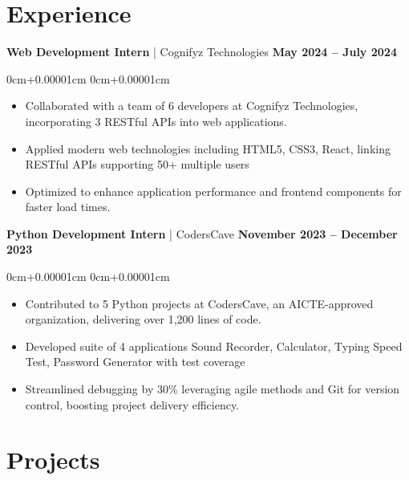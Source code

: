 \documentclass[10pt,a4paper]{article}
\newenvironment{highlights}{
    \begin{itemize}[
        topsep=0.10cm,
        parsep=0.10cm,
        partopsep=0pt,
        itemsep=0pt,
        leftmargin=10pt,
    ]
    }{
    \end{itemize}
}
\newenvironment{onecolentry}{
    \begin{adjustwidth}{
        0cm+0.00001cm
    }{
        0cm+0.00001cm
    }
    }{
    \end{adjustwidth}
}
\begin{document}
    \section{Experience}\label{sec:experience}

    \textbf{Web Development Intern} | Cognifyz Technologies \hfill \textbf{May 2024 -- July 2024} \\
    \begin{onecolentry}
        \begin{highlights}
            \vspace{0.01cm}
            \item Collaborated with a team of 6 developers at Cognifyz Technologies, incorporating 3 RESTful APIs into web applications.
            \item Applied modern web technologies including HTML5, CSS3, React, linking RESTful APIs supporting 50+ multiple users
            \item Optimized to enhance application performance and frontend components for faster load times.
        \end{highlights}
    \end{onecolentry}
    \vspace{0.1cm}
    \textbf{Python Development Intern} | CodersCave \hfill \textbf{November 2023 -- December 2023} \\
    \begin{onecolentry}
        \begin{highlights}
            \vspace{0.01cm}
            \item Contributed to 5 Python projects at CodersCave, an AICTE-approved organization, delivering over 1,200 lines of code.
            \item Developed suite of 4 applications Sound Recorder, Calculator, Typing Speed Test, Password Generator with test coverage
            \item Streamlined debugging by 30\% leveraging agile methods and Git for version control, boosting project delivery efficiency. \\
        \end{highlights}
    \end{onecolentry}

    \section{Projects}\label{sec:projects}
\end{document}
